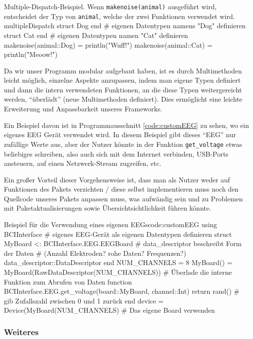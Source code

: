 \documentclass[10pt]{article}
\newcommand{\coderef}[1]{Programmausschnitt \ref{#1}}
\begin{document}
\begin{code}{%
Multiple-Dispatch-Beispiel. Wenn \texttt{makenoise(animal)} ausgeführt wird, entscheidet der Typ von \texttt{animal}, welche der zwei Funktionen verwendet wird.
}{multipleDispatch}
struct Dog end # eigenen Datentypen namens "Dog" definieren
struct Cat end # eigenen Datentypen namen "Cat" definieren
makenoise(animal::Dog) = println("Wuff!")
makenoise(animal::Cat) = println("Meoow!")
\end{code}

Da wir unser Programm modular aufgebaut haben, ist es durch Multimethoden leicht möglich, einzelne Aspekte anzupassen, indem man eigene Typen definiert und dann die intern verwendeten Funktionen, an die diese Typen weitergereicht werden, \enquote{überlädt} (neue Multimethoden definiert). Dies ermöglicht eine leichte Erweiterung und Anpassbarkeit unseres Frameworks.

Ein Beispiel davon ist in \coderef{code:customEEG} zu sehen, wo ein eigenes EEG Gerät verwendet wird. In diesem Beispiel gibt dieses \enquote{EEG} nur zufällige Werte aus, aber der Nutzer könnte in der Funktion \texttt{get_voltage} etwas beliebiges schreiben, also auch sich mit dem Internet verbinden, USB-Ports ansteuern, auf einen Netzwerk-Stream zugreifen, etc. 

Ein großer Vorteil dieser Vorgehensweise ist, dass man als Nutzer weder auf Funktionen des Pakets verzichten / diese selbst implementieren muss noch den Quellcode unseres Pakets anpassen muss, was aufwändig sein und zu Problemen mit Paketaktualisierungen sowie Übersichtsichtlichkeit führen könnte. 

\begin{code}[0.8]{Beispiel für die Verwendung eines eigenen EEGs}{code:customEEG}
using BCIInterface
# eigenes EEG-Gerät als eigenen Datentypen definieren
struct MyBoard <: BCIInterface.EEG.EEGBoard
    # data_descriptor beschreibt Form der Daten
    # (Anzahl Elektroden? rohe Daten? Frequenzen?)
    data_descriptor::DataDescriptor
end
NUM_CHANNELS = 8
MyBoard() = MyBoard(RawDataDescriptor(NUM_CHANNELS))
# Überlade die interne Funktion zum Abrufen von Daten
function BCIInterface.EEG.get_voltage(board::MyBoard, channel::Int)
    return rand() # gib Zufallszahl zwischen 0 und 1 zurück
end
device = Device(MyBoard(NUM_CHANNELS) # Das eigene Board verwenden
\end{code}

\subsubsection{Weiteres}
\end{document}
